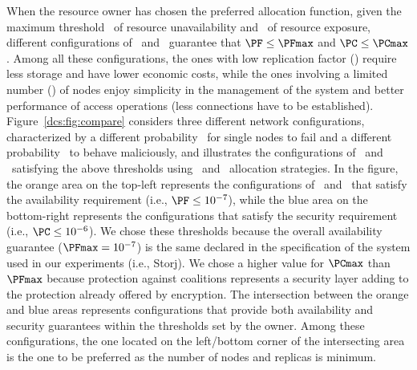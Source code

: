 When the resource owner has chosen the preferred allocation function,
given the maximum threshold \PFmax\ of resource unavailability and
\PCmax\ of resource exposure, different configurations of \nk\ and
\nr\ guarantee that $\PF \leq \PFmax$ and $\PC \leq \PCmax$. Among all
these configurations, the ones with low replication factor (\nr)
require less storage and have lower economic costs, while the ones
involving a limited number (\nn) of nodes enjoy simplicity in the
management of the system and better performance of access operations
(less connections have to be established).  Figure~\ref{dcs:fig:compare}
considers three different network configurations, characterized by a
different probability \pf\ for single nodes to fail and a different
probability \pc\ to behave maliciously, and illustrates the
configurations of \nk\ and \nr\ satisfying the above thresholds using
\diagonal\ and \compact\ allocation strategies. In the figure, the
orange area on the top-left represents the configurations of \nk\ and
\nr\ that satisfy the availability requirement (i.e., $\PF \leq
10^{-7}$), while the blue area on the bottom-right represents the
configurations that satisfy the security requirement (i.e., $\PC \leq
10^{-6}$). We chose these thresholds because the overall availability
guarantee ($\PFmax = 10^{-7}$) is the same declared in the
specification of the system used in our experiments (i.e., Storj). We
chose a higher value for $\PCmax$ than $\PFmax$ because protection
against coalitions represents a security layer adding to the
protection already offered by encryption. The intersection between the
orange and blue areas represents configurations that provide both
availability and security guarantees within the thresholds set by the
owner. Among these configurations, the one located on the left/bottom
corner of the intersecting area is the one to be preferred as the
number of nodes and replicas is minimum.


